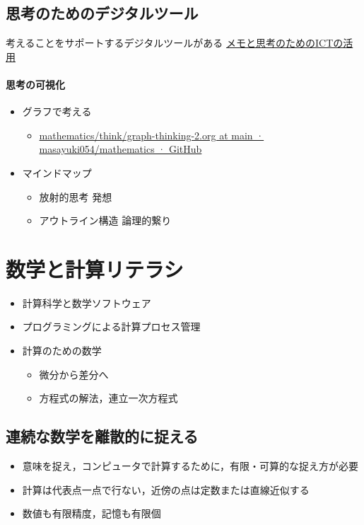 \documentclass[dvipdfmx,11pat]{jarticle}
\begin{document}
\subsection{思考のためのデジタルツール}
\label{sec:orga186ae9}
考えることをサポートするデジタルツールがある \href{https://masayuki054.github.io/ict\_literacy\_for\_thinking\_and\_memo/}{メモと思考のためのICTの活用}
\paragraph{思考の可視化}
\label{sec:org49cecf2}
\begin{itemize}
\item グラフで考える
\begin{itemize}
\item \href{https://github.com/masayuki054/mathematics/blob/main/think/graph-thinking-2.org}{mathematics/think/graph-thinking-2.org at main · masayuki054/mathematics · GitHub}
\end{itemize}
\item マインドマップ
\begin{itemize}
\item 放射的思考 発想
\item アウトライン構造 論理的繋り
\end{itemize}
\end{itemize}
\section{数学と計算リテラシ}
\label{sec:orgfa6fb20}
\begin{itemize}
\item 計算科学と数学ソフトウェア
\item プログラミングによる計算プロセス管理
\item 計算のための数学
\begin{itemize}
\item 微分から差分へ
\item 方程式の解法，連立一次方程式
\end{itemize}
\end{itemize}
\subsection{連続な数学を離散的に捉える}
\label{sec:org8cbf44c}
\begin{itemize}
\item 意味を捉え，コンピュータで計算するために，有限・可算的な捉え方が必要
\item 計算は代表点一点で行ない，近傍の点は定数または直線近似する
\item 数値も有限精度，記憶も有限個
\end{itemize}
\end{document}
